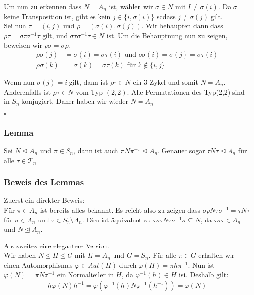 \documentclass[12pt, german]{article}
\newcommand{\bewiesen}{
	
	\begin{flushright}
		$\square$  \\
\end{flushright}}
\begin{document}
	Um nun zu erkennen dass $N=A_n$ ist, wählen wir $\sigma \in N$ mit $I \not = \sigma(i)$. Da $\sigma$ keine Transposition ist, gibt es kein $j \in \{i, \sigma(i)\}$ sodass $j \not=\sigma(j)$ gilt. \\
	
	Sei nun $\tau = (i, j)$ und $\rho = (\sigma(i), \sigma(j))$. 
	Wir behaupten dann dass $\rho\tau = \sigma\tau\sigma^{-1}\tau$ gilt, und $\sigma\tau\sigma^{-1}\tau \in N$ ist. Um die Behauptnung nun zu zeigen, beweisen wir $\rho\sigma = \sigma\rho$. 
	\begin{align*}
		\rho\sigma(j) &= \sigma(i) = \sigma\tau(i) \text{ und } \rho\sigma(i) = \sigma(j) = \sigma\tau(i) \\
		\rho\sigma(k) &= \sigma(k) = \sigma\tau(k) \text{ für } k \not \in \{i, j\}
	\end{align*}
	
	Wenn nun $\sigma(j) = i$ gilt, dann ist $\rho\tau \in N$ ein $3$-Zykel und somit $N=A_n$. 
	Anderenfalls ist $\rho\tau \in N$ vom Typ $(2,2)$. Alle Permutationen des Typ(2,2) sind in $S_n$ konjugiert. Daher haben wir wieder $N=A_n$
	\bewiesen
	
	\subsubsection{Lemma}
	Sei $N \trianglelefteq A_n$ und $\pi \in S_n$, dann ist auch $\pi N\pi^{-1} \trianglelefteq A_n$. Genauer sogar $\tau N \tau \trianglelefteq A_n$ für alle $\tau \in \mathcal T_n$
	\subsubsection{Beweis des Lemmas}
	Zuerst ein direkter Beweis: \\
	Für $\pi \in A_n$ ist bereits alles bekannt. Es reicht also zu zeigen dass $\sigma\rho N\tau\sigma^{-1} = \tau N \tau$ für $\sigma \in A_n$ und $\tau\in S_n \setminus A_n$. Dies ist äquivalent zu $ \tau \sigma \tau N \tau \sigma^{-1}\sigma \subseteq N$, da $\tau\sigma\tau \in A_n$ und $N\trianglelefteq A_n$. 
	\newline
	
	Als zweites eine elegantere Version: \\
	Wir haben $N \trianglelefteq H \trianglelefteq G$ mit $H = A_n$ und $G= S_n$. Für alle $\pi \in G$ erhalten wir einen Automorphismus $\varphi \in Aut(H)$ durch $\varphi(H) = \pi h\pi^{-1}$. Nun ist $\varphi(N) = \pi N\pi^{-1}$ ein Normalteiler in $H$, da $\varphi^{-1}(h) \in H$ ist. 
	Deshalb gilt: 
	\begin{align*}
		h\varphi(N)h^{-1} = \varphi(\varphi^{-1}(h)N\varphi^{-1}(h^{-1})) = \varphi(N)
	\end{align*}
	
\end{document}
